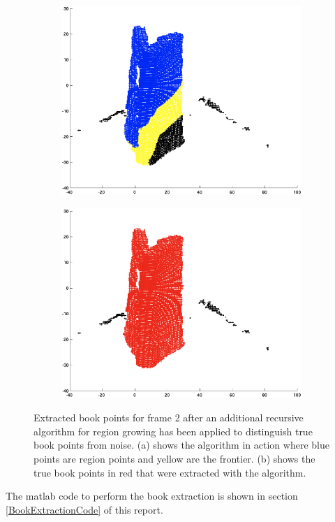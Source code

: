 \begin{figure}[H]
	\centering
	\begin{subfigure}[b]{0.45\textwidth}
		\centering
		\includegraphics[width=\textwidth]{Images/cleaningIteration(1).png}
		\subcaption{}
		\label{fig:cleaningIteration}
	\end{subfigure}%
	\hspace{1cm}
	\begin{subfigure}[b]{0.45\textwidth}
		\centering
		\includegraphics[width=\textwidth]{Images/6-RegionGrowingCleaning(1).png}
		\subcaption{}
		\label{fig:bookPointsFrame2Cleaned}
	\end{subfigure}
	\caption{Extracted book points for frame 2 after an additional recursive algorithm for region growing has been applied to distinguish true book points from noise. (a) shows the algorithm in action where blue points are region points and yellow are the frontier. (b) shows the true book points in red that were extracted with the algorithm.}
\end{figure}

The matlab code to perform the book extraction is shown in section \ref{BookExtractionCode} of this report.